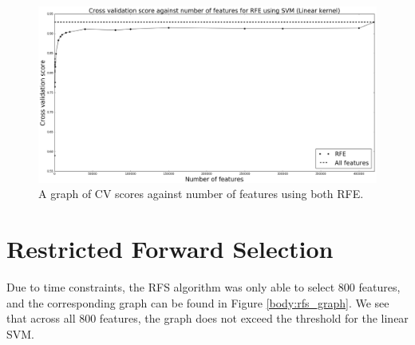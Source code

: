 \documentclass[12pt, twoside, a4paper]{report}
\begin{document}
\begin{figure}
\centering
\includegraphics[width=\textwidth]{images/rfe_linear_all.jpeg}
\caption{A graph of CV scores against number of features using both RFE.}
\label{body:rfe:graph}
\end{figure}

\section{Restricted Forward Selection}

Due to time constraints, the RFS algorithm was only able to select 800 features, and the corresponding graph can be found in Figure \ref{body:rfs_graph}. We see that across all 800 features, the graph does not exceed the threshold for the linear SVM.
\end{document}
